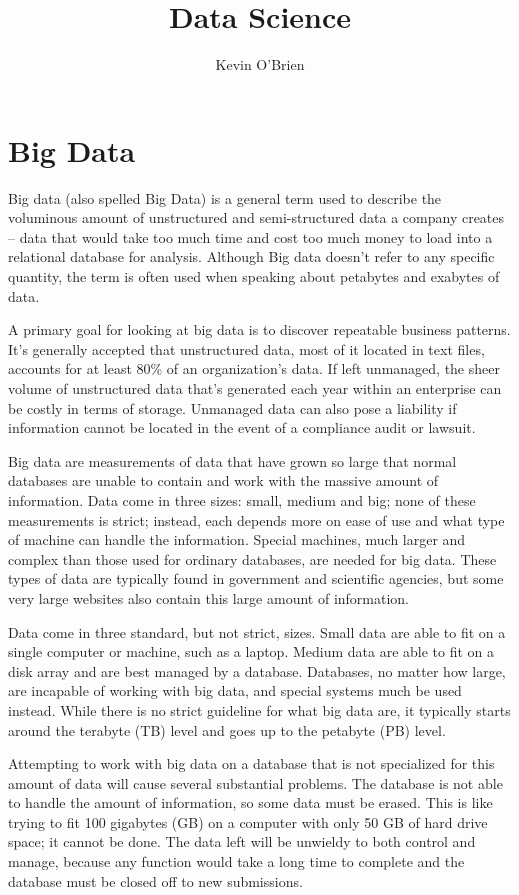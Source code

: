 \documentclass[12pt]{article}
\title{Data Science}
\author{Kevin O'Brien}
\begin{document}
	\section{Big Data}

Big data (also spelled Big Data) is a general term used to describe the voluminous amount of unstructured and semi-structured data a company creates -- data that would take too much time and cost too much money to load into a relational database for analysis. Although Big data doesn't refer to any specific quantity, the term is often used when speaking about petabytes and exabytes of data.

A primary goal for looking at big data is to discover repeatable business patterns. It’s generally accepted that unstructured data, most of it located in text files, accounts for at least 80\% of an organization’s data. If left unmanaged, the sheer volume of unstructured data that’s generated each year within an enterprise can be costly in terms of storage. Unmanaged data can also pose
a liability if information cannot be located in the event of a compliance audit or lawsuit.



Big data are measurements of data that have grown so large that normal databases are unable to contain and work with the massive amount of information. Data come in three sizes: small, medium and big; none of these measurements is strict; instead, each depends more on ease of use and what type of machine can handle the information. Special machines, much larger and complex than those used for ordinary databases, are needed for big data. These types of data are typically found in government and scientific agencies, but some very large websites also contain this large amount of information.


Data come in three standard, but not strict, sizes. Small data are able to fit on a single computer or machine, such as a laptop. Medium data are able to fit on a disk array and are best managed by a database. Databases, no matter how large, are incapable of working with big data, and special systems much be used instead. While there is no strict guideline for what big data are, it typically starts around the terabyte (TB) level and goes up to the petabyte (PB) level.


Attempting to work with big data on a database that is not specialized for this amount of data will cause several substantial problems. The database is not able to handle the amount of information, so some data must be erased. This is like trying to fit 100 gigabytes (GB) on a computer with only 50 GB of hard drive space; it cannot be done. The data left will be unwieldy to both control and manage, because any function would take a long time to complete and the database must be closed off to new submissions.
\end{document}
